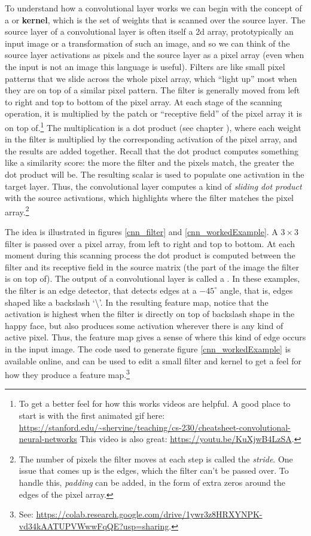 To understand how a convolutional  layer works we can begin with the concept of a  or \textbf{kernel}, which is the set of weights that is scanned over the source layer. The source layer of a convolutional layer is often itself a 2d array, prototypically an input image or a transformation of such an image, and so we can think of the source layer activations as pixels and the source layer as a pixel array (even when the input is not an image this language is useful). Filters are like small pixel patterns that we slide across the whole pixel array, which ``light up'' most when they are on top of a similar pixel pattern. The filter is generally moved from left to right and top to bottom of the pixel array. At each stage of the scanning operation, it is multiplied by the patch or ``receptive field''  of the pixel array it is on top of.\footnote{To get a better feel for how this works videos are  helpful. A good place  to start is with the first animated gif here: \url{https://stanford.edu/~shervine/teaching/cs-230/cheatsheet-convolutional-neural-networks} This video is also great: \url{https://youtu.be/KuXjwB4LzSA}.}  The multiplication is a dot product (see chapter ),  where each weight in the filter is multiplied by the corresponding activation of the pixel array, and the results are added together.  Recall that the dot product computes something like a similarity score: the more the filter and the pixels match, the greater the dot product will be. The resulting scalar is used to populate one activation in the target layer. Thus, the convolutional layer computes a kind of \emph{sliding dot product} with the source activations, which highlights where the filter matches the pixel array.\footnote{The number of pixels the filter moves at each step is called the \emph{stride}. One issue that comes up is the edges, which the filter can't be passed over. To handle this, \emph{padding} can be added, in the form of extra zeros around the edges of the pixel array.}

The idea is illustrated in figures \ref{cnn_filter} and \ref{cnn_workedExample}. A $3 \times 3$ filter is passed over a pixel array, from left to right and top to bottom. At each moment during this scanning process the dot product is computed between the filter and its receptive field in the source matrix (the part of the image the filter is on top of). The output of a convolutional layer is called a . In these examples, the filter is an edge detector, that detects edges at a $-45^\circ$ angle, that is, edges shaped like a backslash `\textbackslash'. In the resulting feature map, notice that the activation is highest when the filter is directly on top of backslash shape in the happy face, but also produces some activation wherever there is any kind of active pixel. Thus, the feature map gives a sense of where this kind of edge occurs in the input image. The code used to generate figure \ref{cnn_workedExample} is available online, and can be used to edit a small filter and kernel to get a feel for how they produce a feature map.\footnote{See: \url{https://colab.research.google.com/drive/1ywr3z8HRXYNPK-vd34kAATUPVWwwFqQE?usp=sharing}.}

